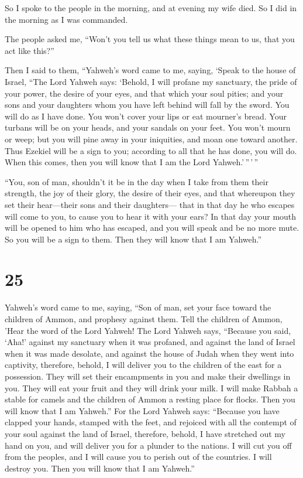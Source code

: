  So I spoke to the people in the morning, and at evening
my wife died. So I did in the morning as I was commanded.

 The people asked me, ``Won't you tell us what these
things mean to us, that you act like this?''

 Then I said to them, ``Yahweh's word came to me, saying,
 `Speak to the house of Israel, ``The Lord Yahweh says:
`Behold, I will profane my sanctuary, the pride of your power, the
desire of your eyes, and that which your soul pities; and your sons and
your daughters whom you have left behind will fall by the sword.
 You will do as I have done. You won't cover your lips or
eat mourner's bread.  Your turbans will be on your heads,
and your sandals on your feet. You won't mourn or weep; but you will
pine away in your iniquities, and moan one toward another.
 Thus Ezekiel will be a sign to you; according to all
that he has done, you will do. When this comes, then you will know that
I am the Lord Yahweh.'\,''\,'\,''

 ``You, son of man, shouldn't it be in the day when I
take from them their strength, the joy of their glory, the desire of
their eyes, and that whereupon they set their hear---their sons and
their daughters---  that in that day he who escapes will
come to you, to cause you to hear it with your ears?  In
that day your mouth will be opened to him who has escaped, and you will
speak and be no more mute. So you will be a sign to them. Then they will
know that I am Yahweh.''

\hypertarget{section-23}{%
\section{25}\label{section-23}}

 Yahweh's word came to me, saying,  ``Son of
man, set your face toward the children of Ammon, and prophesy against
them.  Tell the children of Ammon, 'Hear the word of the
Lord Yahweh! The Lord Yahweh says, ``Because you said, `Aha!' against my
sanctuary when it was profaned, and against the land of Israel when it
was made desolate, and against the house of Judah when they went into
captivity,  therefore, behold, I will deliver you to the
children of the east for a possession. They will set their encampments
in you and make their dwellings in you. They will eat your fruit and
they will drink your milk.  I will make Rabbah a stable
for camels and the children of Ammon a resting place for flocks. Then
you will know that I am Yahweh.''  For the Lord Yahweh
says: ``Because you have clapped your hands, stamped with the feet, and
rejoiced with all the contempt of your soul against the land of Israel,
 therefore, behold, I have stretched out my hand on you,
and will deliver you for a plunder to the nations. I will cut you off
from the peoples, and I will cause you to perish out of the countries. I
will destroy you. Then you will know that I am Yahweh.''


